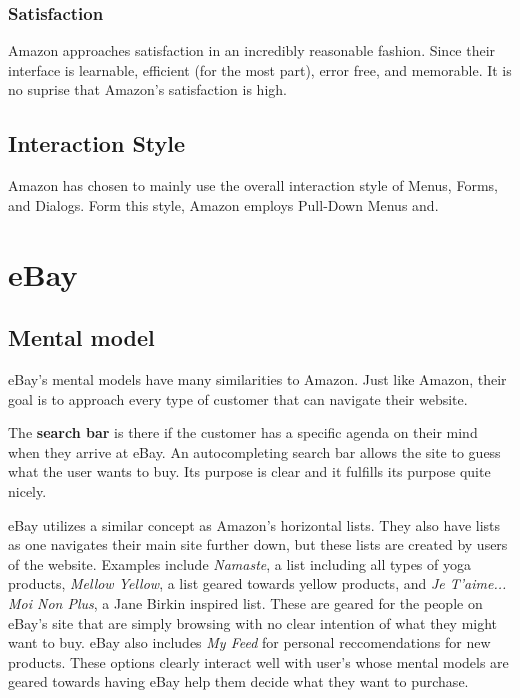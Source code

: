 \documentclass[11pt, oneside]{article}
\begin{document}
\subsubsection{Satisfaction}
Amazon approaches satisfaction in an incredibly reasonable fashion. Since their interface is learnable, efficient (for the most part), error free, and memorable. It is no suprise that Amazon's satisfaction is high.


\subsection{Interaction Style}
Amazon has chosen to mainly use the overall interaction style of Menus, Forms, and Dialogs. Form this style, Amazon employs Pull-Down Menus and.


\pagebreak



\section{eBay}

\subsection{Mental model}

eBay's mental models have many similarities to Amazon. Just like Amazon, their goal is to approach every type of customer that can navigate their website.

The \textbf{search bar} is there if the customer has a specific agenda on their mind when they arrive at eBay. An autocompleting search bar allows the site to guess what the user wants to buy. Its purpose is clear and it fulfills its purpose quite nicely.

eBay utilizes a similar concept as Amazon's horizontal lists. They also have lists as one navigates their main site further down, but these lists are created by users of the website. Examples include \textit{Namaste}, a list including all types of yoga products, \textit{Mellow Yellow}, a list geared towards yellow products, and \textit{Je T'aime... Moi Non Plus}, a Jane Birkin inspired list. These are geared for the people on eBay's site that are simply browsing with no clear intention of what they might want to buy. eBay also includes \textit{My Feed} for personal reccomendations for new products. These options clearly interact well with user's whose mental models are geared towards having eBay help them decide what they want to purchase.
\end{document}
